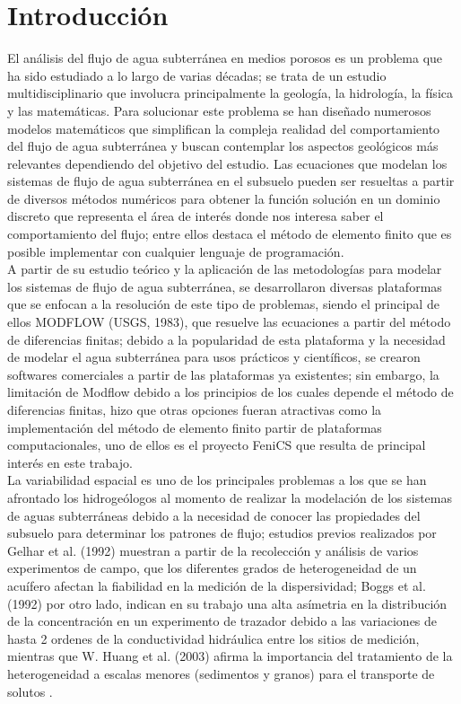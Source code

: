 \chapter*{Introducción}
El análisis del flujo de agua subterránea en medios porosos es un problema que ha sido estudiado a lo largo de varias décadas; se trata de un estudio multidisciplinario que involucra principalmente la geología, la hidrología, la física y las matemáticas. Para solucionar este problema se han diseñado numerosos modelos matemáticos que simplifican la compleja realidad del comportamiento del flujo de agua subterránea y buscan contemplar los aspectos geológicos más relevantes dependiendo del objetivo del estudio. Las ecuaciones que modelan los sistemas de flujo de agua subterránea en el subsuelo pueden ser resueltas a partir de diversos métodos numéricos para obtener la función solución en un dominio discreto que representa el área de interés donde nos interesa saber el comportamiento del flujo; entre ellos destaca el método de elemento finito que es posible implementar con cualquier lenguaje de programación. 
\\


A partir de su estudio teórico y la aplicación de las metodologías para modelar los sistemas de flujo de agua subterránea, se desarrollaron diversas plataformas que se enfocan a la resolución de este tipo de problemas, siendo el principal de ellos MODFLOW (USGS, 1983), que resuelve las ecuaciones a partir del método de diferencias finitas; debido a la popularidad de esta plataforma y la necesidad de modelar el agua subterránea para usos prácticos y científicos, se crearon softwares comerciales a partir de las plataformas ya existentes; sin embargo, la limitación de Modflow debido a los principios de los cuales depende el método de diferencias finitas, hizo que otras opciones fueran atractivas como la implementación del método de elemento finito partir de plataformas computacionales, uno de ellos es el proyecto FeniCS que resulta de principal interés en este trabajo. 
\\

La variabilidad espacial es uno de los principales problemas a los que se han afrontado los hidrogeólogos al momento de realizar la modelación de los sistemas de aguas subterráneas debido a la necesidad de conocer las propiedades del subsuelo para determinar los patrones de flujo; estudios previos realizados por Gelhar et al. (1992) muestran a partir de la recolección y análisis de varios experimentos de campo, que los diferentes grados de heterogeneidad de un acuífero afectan la fiabilidad en la medición de la dispersividad; Boggs et al. (1992) por otro lado, indican en su trabajo una alta asímetria en la distribución de la concentración en un experimento de trazador debido a las variaciones de hasta 2 ordenes de la conductividad hidráulica entre los sitios de medición, mientras que W. Huang et al. (2003) afirma la importancia del tratamiento de la heterogeneidad a escalas menores (sedimentos y granos) para el transporte de solutos \cite{Huang2003} \cite{Gelhar1992} \cite{Boggs1992}. 
\\

